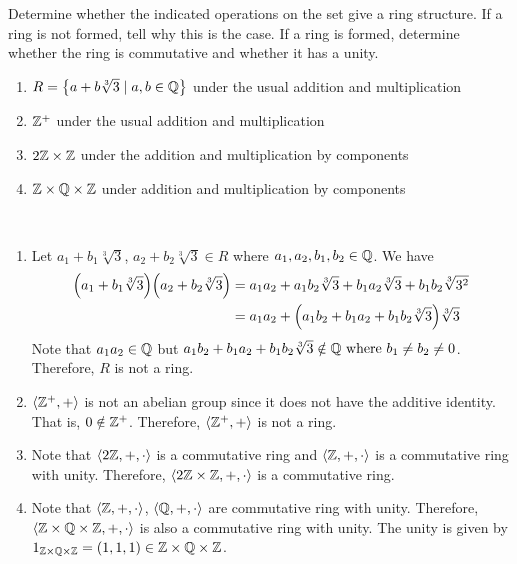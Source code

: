 \begin{exercise}
    Determine whether the indicated operations on the set give a
    ring structure. If a ring is not formed, tell why this is the case.
    If a ring is formed, determine whether the ring is commutative
    and whether it has a unity.
    
    \begin{enumerate}
        \item $R = \qty{a + b\sqrt[3]{3} \mid a, b \in \mathbb{Q}}$ under the usual addition and multiplication
        \item $\mathbb{Z}^+$ under the usual addition and multiplication
        \item $2\mathbb{Z} \times \mathbb{Z}$ under the addition and multiplication by components
        \item $\mathbb{Z} \times \mathbb{Q} \times \mathbb{Z}$ under addition and multiplication by components
    \end{enumerate}
\end{exercise}

\begin{solution} \phantom{blank} \\
    \begin{enumerate} 
        \item Let $a_1 + b_1 \sqrt[3]{3}$, $a_2 + b_2 \sqrt[3]{3} \in R$ where $a_1, a_2, b_1, b_2 \in \mathbb{Q}$. We have
        \begin{align*}
            \qty(a_1 + b_1 \sqrt[3]{3}) \qty(a_2 + b_2 \sqrt[3]{3}) &= a_1a_2 + a_1 b_2\sqrt[3]{3} + b_1 a_2 \sqrt[3]{3} + b_1b_2\sqrt[3]{3^2} \\
            &= a_1a_2 + \qty(a_1b_2 + b_1 a_2 + b_1b_2\sqrt[3]{3})\sqrt[3]{3}
        \end{align*}
        Note that $a_1a_2 \in \mathbb{Q}$ but $a_1b_2 + b_1a_2 + b_1b_2 \sqrt[3]{3} \notin \mathbb{Q} \text{ where }  b_1 \neq b_2 \neq 0$. Therefore, $R$ is not a ring.
        
        \item $\langle \mathbb{Z}^+, + \rangle$ is not an abelian group since it does not have the additive identity. That is,  $0 \notin \mathbb{Z}^+$. Therefore, $\langle \mathbb{Z}^+, + \rangle$ is not a ring.
        
        \item Note that $\langle 2\mathbb{Z}, +, \cdot \rangle$ is a commutative ring and $\langle \mathbb{Z}, +, \cdot \rangle$ is a commutative ring with unity. Therefore, $\langle 2\mathbb{Z} \times \mathbb{Z}, +, \cdot \rangle$ is a commutative ring.
        
        \item Note that $\langle \mathbb{Z}, +, \cdot \rangle$, $\langle \mathbb{Q}, +, \cdot \rangle$ are commutative ring with unity. Therefore, $\langle \mathbb{Z} \times \mathbb{Q} \times \mathbb{Z}, +, \cdot\rangle$ is also a commutative ring with unity. The unity is given by $1_{\mathbb{Z} \times \mathbb{Q} \times \mathbb{Z}} = (1, 1, 1) \in \mathbb{Z} \times \mathbb{Q} \times \mathbb{Z}$.
    \end{enumerate}

\end{solution}

